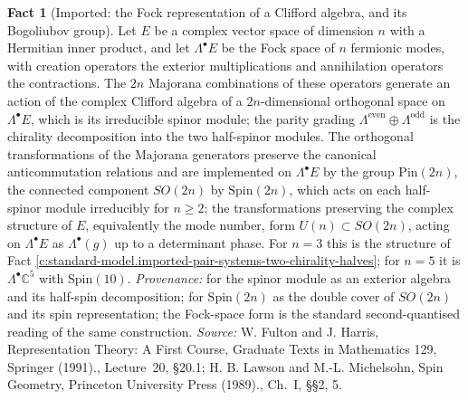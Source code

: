 \documentclass[11pt]{article}
\theoremstyle{definition}
\newtheorem{fact}[theorem]{Fact}
\theoremstyle{plain}
\providecommand{\C}{}\renewcommand{\C}{\mathbb{C}}
\begin{document}
\begin{fact}[Imported: the Fock representation of a Clifford algebra, and its Bogoliubov group]\label{c:standard-model.imported-fock-representation-clifford-algebra-bogoliubov}
Let $E$ be a complex vector space of dimension $n$ with a Hermitian inner product, and let $\Lambda^{\bullet}E$ be the Fock space of $n$ fermionic modes, with creation operators the exterior multiplications and annihilation operators the contractions. The $2n$ Majorana combinations of these operators generate an action of the complex Clifford algebra of a $2n$-dimensional orthogonal space on $\Lambda^{\bullet}E$, which is its irreducible spinor module; the parity grading $\Lambda^{\mathrm{even}} \oplus \Lambda^{\mathrm{odd}}$ is the chirality decomposition into the two half-spinor modules. The orthogonal transformations of the Majorana generators preserve the canonical anticommutation relations and are implemented on $\Lambda^{\bullet}E$ by the group $\mathrm{Pin}(2n)$, the connected component $SO(2n)$ by $\mathrm{Spin}(2n)$, which acts on each half-spinor module irreducibly for $n \ge 2$; the transformations preserving the complex structure of $E$, equivalently the mode number, form $U(n) \subset SO(2n)$, acting on $\Lambda^{\bullet}E$ as $\Lambda^{\bullet}(g)$ up to a determinant phase. For $n = 3$ this is the structure of Fact \ref{c:standard-model.imported-pair-systems-two-chirality-halves}; for $n = 5$ it is $\Lambda^{\bullet}\C^{5}$ with $\mathrm{Spin}(10)$. \emph{Provenance:} \cite[Lecture~20, \S 20.1]{FultonHarris1991} for the spinor module as an exterior algebra and its half-spin decomposition; \cite[Ch.~I, \S\S 2, 5]{LawsonMichelsohn1989} for $\mathrm{Spin}(2n)$ as the double cover of $SO(2n)$ and its spin representation; the Fock-space form is the standard second-quantised reading of the same construction.
\emph{Source:} W. Fulton and J. Harris, Representation Theory: A First Course, Graduate Texts in Mathematics 129, Springer (1991)., Lecture~20, \S 20.1; H. B. Lawson and M.-L. Michelsohn, Spin Geometry, Princeton University Press (1989)., Ch.~I, \S\S 2, 5.
\end{fact}
\end{document}
